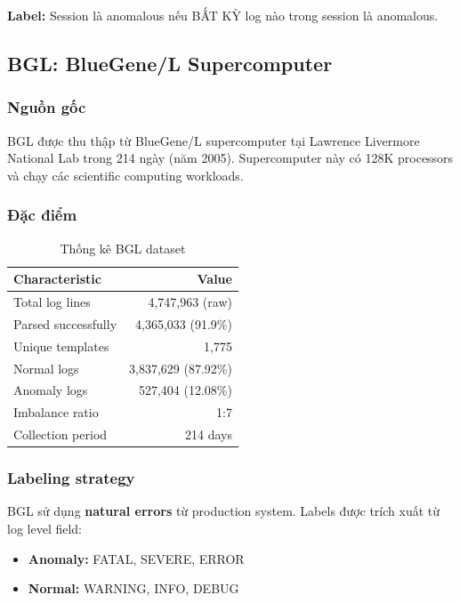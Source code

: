 \textbf{Label:} Session là anomalous nếu BẤT KỲ log nào trong session là anomalous.

\subsection{BGL: BlueGene/L Supercomputer}

\subsubsection{Nguồn gốc}

BGL được thu thập từ BlueGene/L supercomputer tại Lawrence Livermore National Lab trong 214 ngày (năm 2005). Supercomputer này có 128K processors và chạy các scientific computing workloads.

\subsubsection{Đặc điểm}

\begin{table}[h]
\centering
\caption{Thống kê BGL dataset}
\label{tab:bgl-stats}
\begin{tabular}{lr}
\toprule
\textbf{Characteristic} & \textbf{Value} \\
\midrule
Total log lines & 4,747,963 (raw) \\
Parsed successfully & 4,365,033 (91.9\%) \\
Unique templates & 1,775 \\
Normal logs & 3,837,629 (87.92\%) \\
Anomaly logs & 527,404 (12.08\%) \\
Imbalance ratio & 1:7 \\
Collection period & 214 days \\
\bottomrule
\end{tabular}
\end{table}

\subsubsection{Labeling strategy}

BGL sử dụng \textbf{natural errors} từ production system. Labels được trích xuất từ log level field:

\begin{itemize}
    \item \textbf{Anomaly:} FATAL, SEVERE, ERROR
    \item \textbf{Normal:} WARNING, INFO, DEBUG
\end{itemize}

